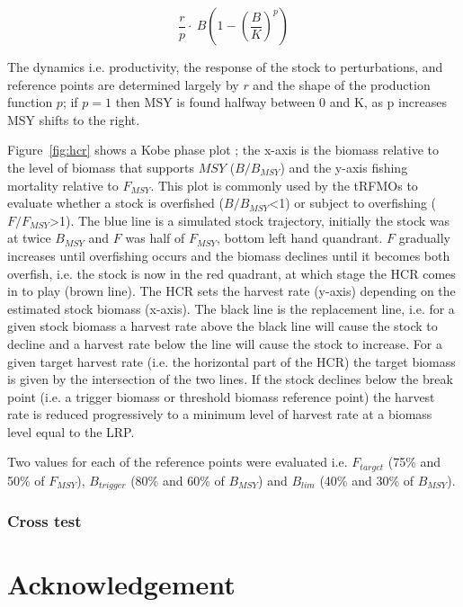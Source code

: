 \documentclass[%
nonumbib,      %
%
]{nrc1}                          %
\begin{document}
\begin{equation}\frac{r}{p}\cdot~B(1-(\frac{B}{K})^p)\end{equation}  

The dynamics i.e. productivity, the response of the stock to perturbations, and reference points are determined largely by $r$ and the shape of the production function $p$; if $p=1$ then MSY is found halfway between 0 and K, as p increases MSY shifts to the right.

Figure~\ref{fig:hcr} shows a Kobe phase plot \citep{kell2016risk}; the x-axis is the biomass relative to the level of biomass that supports $MSY$ ($B/B_{MSY}$) and the y-axis fishing mortality relative to $F_{MSY}$. This plot is commonly used by the tRFMOs to evaluate whether a stock is overfished ($B/B_{MSY}$<1) or subject to overfishing ($F/F_{MSY}$>1). The blue line is a simulated stock trajectory, initially the stock was at twice $B_{MSY}$ and $F$ was half of $F_{MSY}$, bottom left hand quandrant. $F$ gradually increases until overfishing occurs and the biomass declines until it becomes both overfish, i.e. the stock is now in the red quadrant, at which stage the HCR comes in to play (brown line). The HCR sets the harvest rate (y-axis) depending on the estimated stock biomass (x-axis). The black line is the replacement line, i.e. for a given stock biomass a harvest rate above the black line will cause the stock to decline and a harvest rate below the line will cause the stock to increase. For a given target harvest rate (i.e. the horizontal part of the HCR) the target biomass is given by the intersection of the two lines. If the stock declines below the break point (i.e. a trigger biomass or threshold biomass reference point) the harvest rate is reduced progressively to a minimum level of harvest rate at a biomass level equal to the LRP.

Two values for each of the reference points were evaluated i.e.  $F_{target}$ (75\% and 50\% of $F_{MSY}$), $B_{trigger}$ (80\% and 60\% of $B_{MSY}$) and $B_{lim}$ (40\% and 30\% of $B_{MSY}$).  


\subsubsection*{Cross test}



\newpage\clearpage





\section{Acknowledgement}
\end{document}
